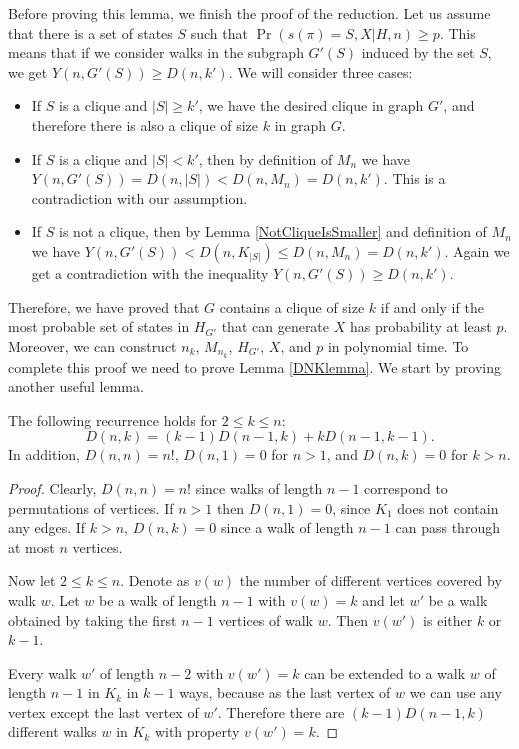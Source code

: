 \begin{reformulate*}
Before proving this lemma, we finish the proof of the reduction. Let
us assume that there is a set of states $S$ such that
$\Pr(s(\pi)=S,X|H,n)\ge p$. This means that if we consider walks in the
subgraph $G'(S)$ induced by the set $S$, we get $Y(n,G'(S))\ge
D(n,k')$. We will consider three cases:
\begin{itemize}
\item If $S$ is a clique and $|S|\ge k'$, we have the desired clique in 
graph $G'$, and therefore there is also a clique of size $k$ in graph $G$. 
\item If $S$ is a clique and $|S|<k'$, then by definition of $M_n$ we have 
$Y(n,G'(S))=D(n,|S|)<D(n,M_n) = 
D(n,k')$. This is a contradiction with our assumption. 
\item If $S$ is not a clique, then by Lemma \ref{NotCliqueIsSmaller}
  and definition of $M_n$ we have $Y(n,G'(S)) < D(n, K_{|S|}) \le
  D(n,M_n) = D(n,k')$. Again we get a contradiction with 
the inequality $Y(n,G'(S))\ge D(n,k')$.
\end{itemize}
Therefore, we have proved that $G$ contains a clique of size $k$ if and
only if the most probable set of states in $H_{G'}$ that can generate $X$ has
probability at least $p$. Moreover, we can construct $n_k$, $M_{n_k}$,
$H_{G'}$, $X$, and $p$ in polynomial time.
To complete this proof we need to prove Lemma \ref{DNKlemma}.  We
start by proving another useful lemma.

\begin{lemma}\label{RecurenceLemma}
The following recurrence holds for $2\leq k\leq n$:
$$D(n,k)=(k-1) D(n-1,k) + k D(n-1,k-1).$$
In addition, $D(n,n)=n!$, $D(n,1) = 0$ for $n>1$, and $D(n,k) = 0$ for $k>n$.
\end{lemma}
\begin{proof}
Clearly, $D(n,n)=n!$ since walks of length $n-1$ correspond to
permutations of vertices.  If $n>1$ then $D(n,1)=0$, since $K_1$ does
not contain any edges.  If $k>n$, $D(n,k)=0$ since a walk of length
$n-1$ can pass through at most $n$ vertices.

Now let $2\leq k\leq n$. Denote as $v(w)$ the number of different
vertices covered by walk $w$. Let $w$ be a walk of length $n-1$ with
$v(w)=k$ and let $w'$ be a walk obtained by taking the first 
$n-1$ vertices of walk $w$. Then $v(w')$ is either $k$ or $k-1$. 

Every walk $w'$ of length $n-2$ with $v(w')=k$ can be extended to a
walk $w$ of length $n-1$ in $K_k$ in $k-1$ ways, because as the last vertex
of $w$ we can use any vertex except the last vertex of $w'$. Therefore
there are $(k-1) D(n-1,k)$ different walks $w$ in $K_k$ with
property $v(w')=k$.


\end{proof}
\end{reformulate*}
